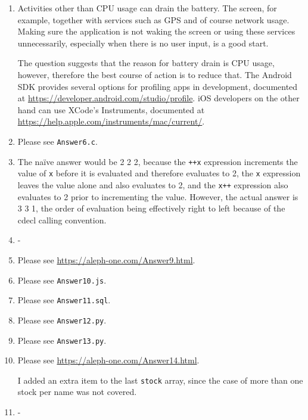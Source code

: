 \documentclass{article}
\begin{document}
\begin{enumerate}[start=0]
\item Activities other than CPU usage can drain the battery. The screen, for example, together with services such as GPS and of course network usage. Making sure the application is not waking the screen or using these services unnecessarily, especially when there is no user input, is a good start.

The question suggests that the reason for battery drain is CPU usage, however, therefore the best course of action is to reduce that. The Android SDK provides several options for profiling apps in development, documented at \url{https://developer.android.com/studio/profile}. iOS developers on the other hand can use XCode's Instruments, documented at \url{https://help.apple.com/instruments/mac/current/}.

\item Please see \texttt{Answer6.c}.

\item The na\"{i}ve answer would be 2 2 2, because the \texttt{++x} expression increments the value of \texttt{x} before it is evaluated and therefore evaluates to 2, the \texttt{x} expression leaves the value alone and also evaluates to 2, and the \texttt{x++} expression also evaluates to 2 prior to incrementing the value. However, the actual answer is 3 3 1, the order of evaluation being effectively right to left because of the cdecl calling convention.

\item -

\item Please see \url{https://aleph-one.com/Answer9.html}.

\item Please see \texttt{Answer10.js}.

\item Please see \texttt{Answer11.sql}. 

\item Please see \texttt{Answer12.py}. 

\item Please see \texttt{Answer13.py}. 

\item Please see \url{https://aleph-one.com/Answer14.html}. 

I added an extra item to the last \texttt{stock} array, since the case of more than one stock per name was not covered.

\item -

\end{enumerate}
\end{document}
